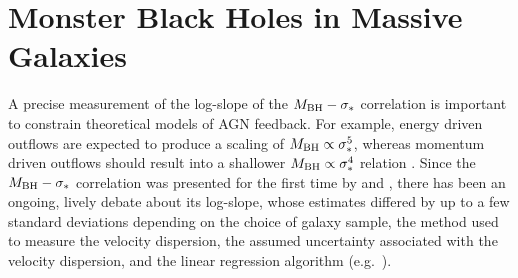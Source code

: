 \chapter{Monster Black Holes in Massive Galaxies}
\label{ch:msigma}

A precise measurement of the log-slope of the $M_{\rm BH} - \sigma_*$ correlation is important 
to constrain theoretical models of AGN feedback. 
For example, energy driven outflows are expected to produce a scaling of $M_{\rm BH} \propto \sigma_*^5$, 
whereas momentum driven outflows should result into a shallower $M_{\rm BH} \propto \sigma_*^4$ relation 
\citep{silkrees1998,fabian1999}. 
Since the $M_{\rm BH} - \sigma_*$ correlation was presented for the first time by \citet{ferraresemerritt2000}
and \citet{gebhardt2000}, 
there has been an ongoing, lively debate about its log-slope, 
whose estimates differed by up to a few standard deviations 
depending on the choice of galaxy sample, the method used to measure the velocity dispersion,
the assumed uncertainty associated with the velocity dispersion, 
and the linear regression algorithm (e.g.~\citealt{tremaine2002}). \\ 

